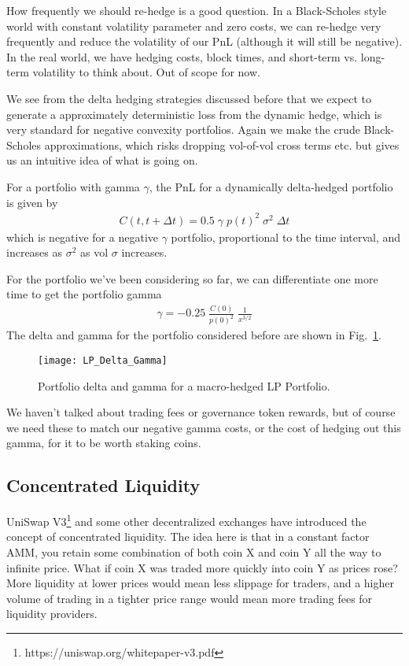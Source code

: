\documentclass{article}
\begin{document}
How frequently we should re-hedge is a good question. In a Black-Scholes style world with constant volatility parameter and zero costs, we can re-hedge very frequently and reduce the volatility of our PnL (although it will still be negative). In the real world, we have hedging costs, block times, and short-term vs. long-term volatility to think about. Out of scope for now.

We see from the delta hedging strategies discussed before that we expect to generate a approximately deterministic loss from the dynamic hedge, which is very standard for negative convexity portfolios. Again we make the crude Black-Scholes approximations, which risks dropping vol-of-vol cross terms etc. but gives us an intuitive idea of what is going on.

For a portfolio with gamma $\gamma$, the PnL for a dynamically delta-hedged portfolio is given by
\begin{align}
C(t, t+\Delta t) = 0.5 \; \gamma \; p(t)^2 \; \sigma^2 \; \Delta t
\label{eqn:gamma_pnl}
\end{align}
which is negative for a negative $\gamma$ portfolio, proportional to the time interval, and increases as $\sigma^2$ as vol $\sigma$ increases.

For the portfolio we've been considering so far, we can differentiate one more time to get the portfolio gamma
\begin{align}
\gamma = -0.25 \; {\frac {C(0)} {p(0)^2}} \; {\frac 1 {x^{3/2}}}
\label{eqn:gamma_portfolio}
\end{align}
The delta and gamma for the portfolio considered before are shown in Fig.~\ref{fig:lp_delta_gamma}.

\begin{figure}
\centering
\texttt{[image: LP\_Delta\_Gamma]}
\caption{Portfolio delta and gamma for a macro-hedged LP Portfolio.}
\label{fig:lp_delta_gamma}
\end{figure}

We haven't talked about trading fees or governance token rewards, but of course we need these to match our negative gamma costs, or the cost of hedging out this gamma, for it to be worth staking coins.


\subsection*{Concentrated Liquidity}
\label{sec:concentrated}

UniSwap V3\footnote{https://uniswap.org/whitepaper-v3.pdf} and some other decentralized exchanges have introduced the concept of concentrated liquidity. The idea here is that in a constant factor AMM, you retain some combination of both coin X and coin Y all the way to infinite price. What if coin X was traded more quickly into coin Y as prices rose? More liquidity at lower prices would mean less slippage for traders, and a higher volume of trading in a tighter price range would mean more trading fees for liquidity providers.
\end{document}
